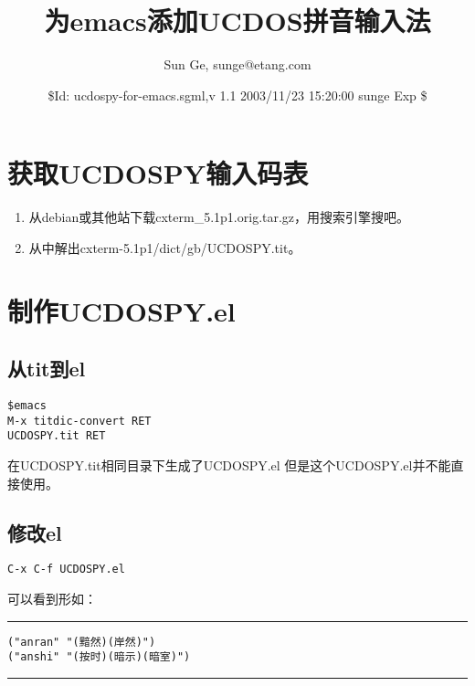 \documentclass[letterpaper]{article}
\title{为emacs添加UCDOS拼音输入法}
\author{Sun Ge, {\ttfamily sunge@etang.com}}
\date{\$Id: ucdospy-for-emacs.sgml,v 1.1 2003/11/23 15:20:00 sunge Exp \$}
\begin{document}
\begin{CJK*}{GB}{song}
\CJKtilde%
%
\settowidth{\parindent}{　　}%
\maketitle
\tableofcontents

\section{获取UCDOSPY输入码表}

\begin{enumerate}
\item 从debian或其他站下载{\ttfamily cxterm\_5.1p1.orig.tar.gz}，用搜索引擎搜吧。
\item 从中解出{\ttfamily cxterm-5.1p1/dict/gb/UCDOSPY.tit}。
\end{enumerate}





\section{制作UCDOSPY.el}


\subsection{从tit到el}

\begin{tscreen}
\begin{verbatim}
$emacs
M-x titdic-convert RET
UCDOSPY.tit RET
\end{verbatim}
\end{tscreen}

在UCDOSPY.tit相同目录下生成了UCDOSPY.el
但是这个UCDOSPY.el并不能直接使用。




\subsection{修改el}

\begin{tscreen}
\begin{verbatim}
C-x C-f UCDOSPY.el
\end{verbatim}
\end{tscreen}

可以看到形如：
\begin{tscreen}
\par
\addvspace{\medskipamount}
\nopagebreak\hrule
\begin{verbatim}
("anran" "(黯然)(岸然)")
("anshi" "(按时)(暗示)(暗室)")
\end{verbatim} 
\nopagebreak\hrule 
\addvspace{\medskipamount}
\end{tscreen}


\end{CJK*}
\end{document}
